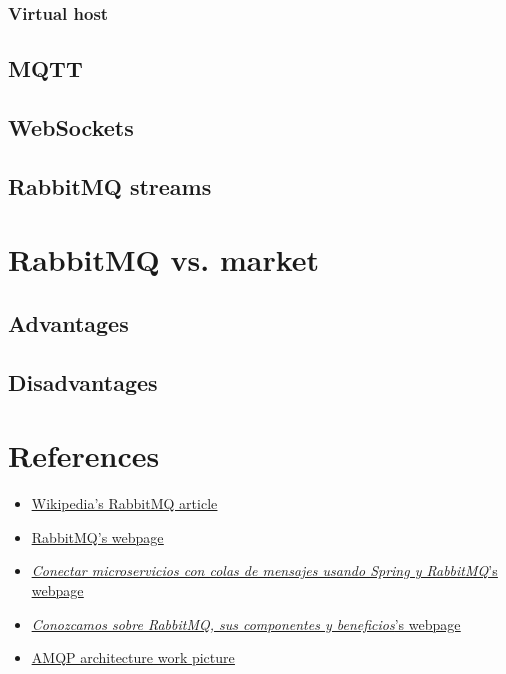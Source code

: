 \documentclass[4paper,12pt]{article}
\begin{document}
\subsubsection*{Virtual host}
\justify{}

\subsection*{MQTT}
\justify{}
\subsection*{WebSockets}
\justify{}
\subsection*{RabbitMQ streams}
\justify{}
\section*{RabbitMQ vs. market}
\justify{}
\newpage
\subsection*{Advantages}
\justify{}
\subsection*{Disadvantages}
\justify{}
\section*{References}
\begin{itemize}
    \item \href{https://en.wikipedia.org/wiki/RabbitMQ}{\underline{Wikipedia's RabbitMQ article}}
    \item \href{https://www.rabbitmq.com}{\underline{RabbitMQ's webpage}}
    \item \href{https://www.sdos.es/blog/microservicios-mensajes-spring-rabbitmq}{\underline{\textit{Conectar microservicios con colas de mensajes usando Spring y RabbitMQ}'s webpage}}
    \item \href{https://www.pragma.com.co/academia/lecciones/conozcamos-sobre-rabbitmq-sus-componentes-y-beneficios}{\underline{\textit{Conozcamos sobre RabbitMQ, sus componentes y beneficios}'s webpage}}
    \item \href{https://www.researchgate.net/publication/325119432/figure/fig5/AS:626093459505153@1526283721309/AMQP-architecture-34.png}{\underline{AMQP architecture work picture}}
\end{itemize}
\end{document}
